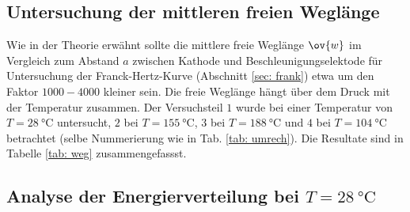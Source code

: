\subsection{Untersuchung der mittleren freien Weglänge}
\FloatBarrier
Wie in der Theorie erwähnt sollte die mittlere freie Weglänge $\ov{w}$ im Vergleich zum
Abstand $a$ zwischen Kathode und Beschleunigungselektode für Untersuchung der Franck-Hertz-Kurve (Abschnitt \ref{sec: frank})
etwa um den Faktor $1000-4000$ kleiner sein. Die freie Weglänge hängt über dem Druck mit der Temperatur zusammen.
Der Versuchsteil $1$ wurde bei einer Temperatur von $T=\SI{28}{\celsius}$ untersucht, $2$ bei $T=\SI{155}{\celsius}$,
$3$ bei $T=\SI{188}{\celsius}$ und $4$ bei $T=\SI{104}{\celsius}$ betrachtet (selbe Nummerierung wie in Tab. \ref{tab: umrech}).
Die Resultate sind in Tabelle \ref{tab: weg} zusammengefassst.


\subsection{Analyse der Energierverteilung bei $T=\SI{28}{\celsius}$}

